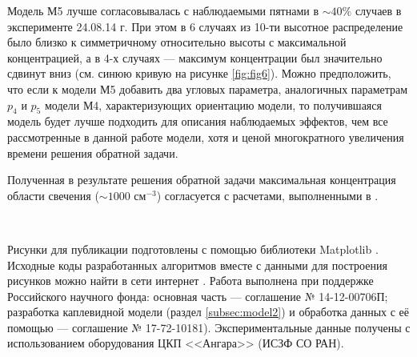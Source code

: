 \documentclass[12pt,a4paper]{article}
\begin{document}
Модель М5 лучше согласовывалась с наблюдаемыми пятнами в $\sim40\%$ случаев в эксперименте 24.08.14 г. При этом в 6 случаях из 10-ти высотное распределение было близко к симметричному относительно высоты с максимальной концентрацией, а в 4-х случаях --- максимум концентрации был значительно сдвинут вниз (см. синюю кривую на рисунке \ref{fig:fig6}). Можно предположить, что если к модели М5 добавить два угловых параметра, аналогичных параметрам $p_4$ и $p_5$ модели М4, характеризующих ориентацию модели, то получившаяся модель будет лучше подходить для описания наблюдаемых эффектов, чем все рассмотренные в данной работе модели, хотя и ценой многократного увеличения времени решения обратной задачи.

Полученная в результате решения обратной задачи максимальная концентрация области свечения ($\sim1000$ см$^{-3}$) согласуется с расчетами, выполненными в \cite{Klimenko2017}.


~\

Рисунки для публикации подготовлены с помощью библиотеки Mat\-plotlib \cite{Hunter2007}. Исходные коды разработанных алгоритмов вместе с данными для построения рисунков можно найти в сети интернет \cite{Shindin2017}.
Работа выполнена при поддержке Российского научного фонда: основная часть --- соглашение № 14-12-00706П; разработка каплевидной модели (раздел \ref{subsec:model2}) и обработка данных с её помощью --- соглашение № 17-72-10181). Экспериментальные данные получены с использованием оборудования ЦКП <<Ангара>> (ИСЗФ СО РАН). 


\end{document}
